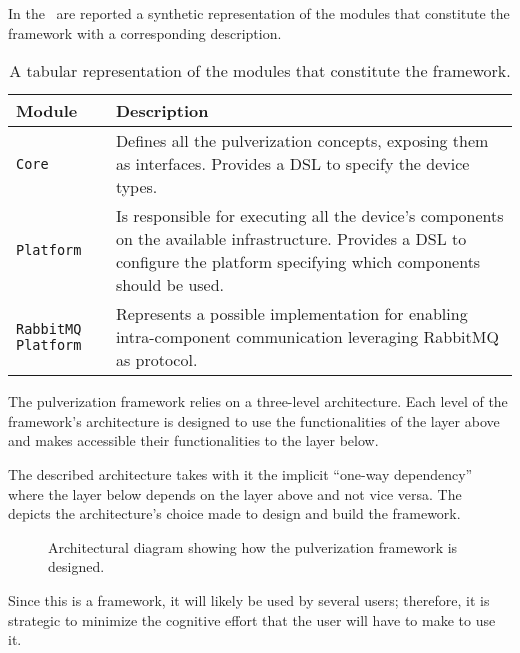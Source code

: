 In the~ are reported a synthetic representation of the modules that constitute the framework with a corresponding
description.

\begin{table}
	\begin{tabularx}{\textwidth}{l X}
		\toprule
		\textbf{Module}            & \textbf{Description}                                                                                             \\ \midrule
		\texttt{Core}              & Defines all the pulverization concepts, exposing them as interfaces.
		Provides a DSL to specify the device types.                                                                                                   \\
		\texttt{Platform}          & Is responsible for executing all the device's components on the available infrastructure.
		Provides a DSL to configure the platform specifying which components should be used.                                                          \\
		\texttt{RabbitMQ Platform} & Represents a possible implementation for enabling intra-component communication leveraging RabbitMQ as protocol. \\ \bottomrule
	\end{tabularx}
	\caption{A tabular representation of the modules that constitute the framework.}
	\label{tab:framework-modules}
\end{table}

The pulverization framework relies on a three-level architecture. Each level of the framework's architecture is designed to use the functionalities
of the layer above and makes accessible their functionalities to the layer below.

The described architecture takes with it the implicit ``one-way dependency'' where the layer below depends on the layer above and not vice versa.
The~ depicts the architecture's choice made to design and build the framework.

\begin{figure}
	\centering
	\caption{Architectural diagram showing how the pulverization framework is designed.}
	\label{fig:framework-architecture}
\end{figure}

Since this is a framework, it will likely be used by several users; therefore, it is strategic to minimize the cognitive effort that the user will
have to make to use it.

